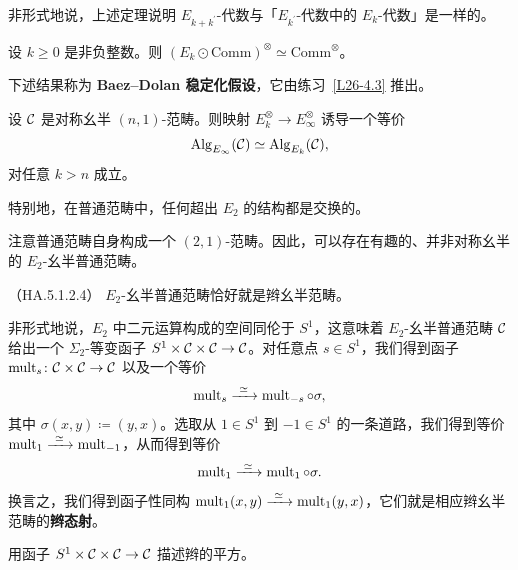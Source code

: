 \begin{remark}\label{L26-4.13}
非形式地说，上述定理说明 $E_{k+k^{\prime}}$-代数与「$E_{k^{\prime}}$-代数中的 $E_{k}$-代数」是一样的。
\end{remark}

\begin{corollary}\label{L26-4.14}
设 $k\ge0$ 是非负整数。则 $(E_{k}\odot\mathrm{Comm})^{\otimes}\simeq\mathrm{Comm}^{\otimes}$。
\end{corollary}

\nitem\label{L26-4.15} 下述结果称为 \textbf{Baez--Dolan 稳定化假设}，它由练习~\ref{L26-4.3} 推出。

\begin{proposition}\label{L26-4.16}
设 $\mathcal{C}$ 是对称幺半 $(n,1)$-范畴。则映射 $E_{k}^{\otimes}\to E_{\infty}^{\otimes}$ 诱导一个等价
\[
\operatorname{Alg}_{E_{\infty}}(\mathcal{C})\simeq\operatorname{Alg}_{E_{k}}(\mathcal{C}),
\]
对任意 $k>n$ 成立。
\end{proposition}

\begin{remark}\label{L26-4.17}
特别地，在普通范畴中，任何超出 $E_{2}$ 的结构都是交换的。
\end{remark}

\nitem\label{L26-4.18} 注意普通范畴自身构成一个 $(2,1)$-范畴。因此，可以存在有趣的、并非对称幺半的 $E_{2}$-幺半普通范畴。

\begin{proposition}\label{L26-4.19}（HA.5.1.2.4）
$E_{2}$-幺半普通范畴恰好就是辫幺半范畴。
\end{proposition}

\begin{remark}\label{L26-4.20}
非形式地说，$E_{2}$ 中二元运算构成的空间同伦于 $S^{1}$，这意味着 $E_{2}$-幺半普通范畴 $\mathcal{C}$ 给出一个 $\Sigma_{2}$-等变函子 $S^{1}\times\mathcal{C}\times\mathcal{C}\to\mathcal{C}$。对任意点 $s\in S^{1}$，我们得到函子 $\operatorname{mult}_{s}\colon\mathcal{C}\times\mathcal{C}\to\mathcal{C}$ 以及一个等价
\[
\mult_{s}\xrightarrow{\ \simeq\ }\mult_{-s}\circ\sigma,
\]
其中 $\sigma(x,y)\coloneqq(y,x)$。选取从 $1\in S^{1}$ 到 $-1\in S^{1}$ 的一条道路，我们得到等价 $\mult_{1}\xrightarrow{\ \simeq\ }\mult_{-1}$，从而得到等价
\[
\mult_{1}\xrightarrow{\ \simeq\ }\mult_{1}\circ\sigma.
\]
换言之，我们得到函子性同构 $\mult_{1}(x,y)\xrightarrow{\ \simeq\ }\mult_{1}(y,x)$，它们就是相应辫幺半范畴的\textbf{辫态射}。
\end{remark}

\begin{exercise}\label{L26-4.21}
用函子 $S^{1}\times\mathcal{C}\times\mathcal{C}\to\mathcal{C}$ 描述辫的平方。
\end{exercise}

